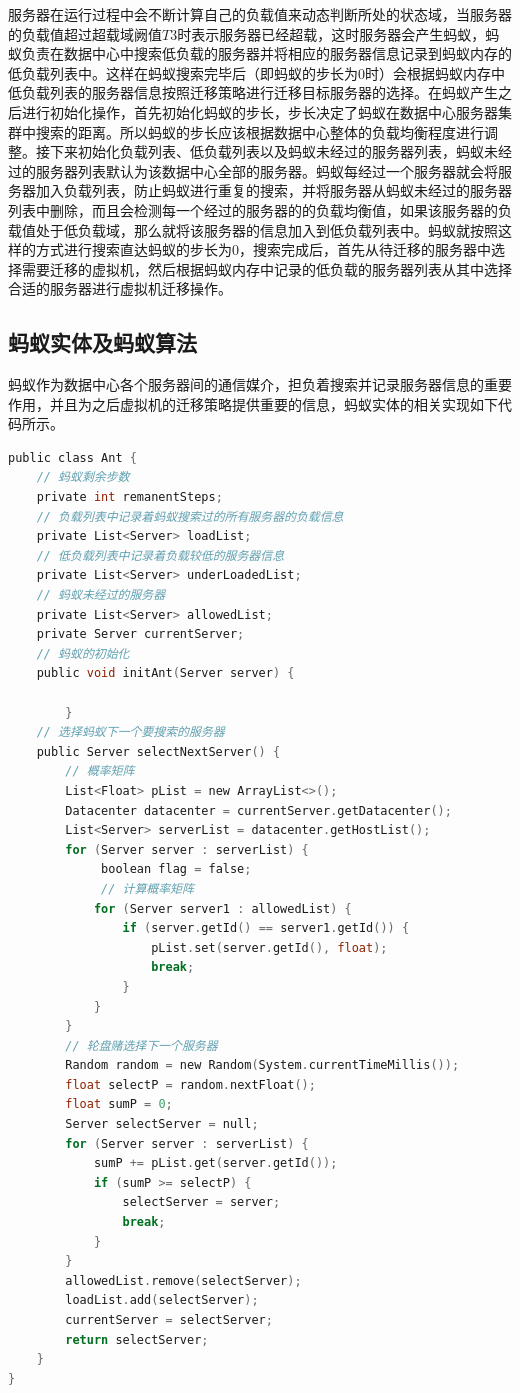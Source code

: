 服务器在运行过程中会不断计算自己的负载值来动态判断所处的状态域，当服务器的负载值超过超载域阙值$ T3 $时表示服务器已经超载，这时服务器会产生蚂蚁，蚂蚁负责在数据中心中搜索低负载的服务器并将相应的服务器信息记录到蚂蚁内存的低负载列表中。这样在蚂蚁搜索完毕后（即蚂蚁的步长为0时）会根据蚂蚁内存中低负载列表的服务器信息按照迁移策略进行迁移目标服务器的选择。在蚂蚁产生之后进行初始化操作，首先初始化蚂蚁的步长，步长决定了蚂蚁在数据中心服务器集群中搜索的距离。所以蚂蚁的步长应该根据数据中心整体的负载均衡程度进行调整。接下来初始化负载列表、低负载列表以及蚂蚁未经过的服务器列表，蚂蚁未经过的服务器列表默认为该数据中心全部的服务器。蚂蚁每经过一个服务器就会将服务器加入负载列表，防止蚂蚁进行重复的搜索，并将服务器从蚂蚁未经过的服务器列表中删除，而且会检测每一个经过的服务器的的负载均衡值，如果该服务器的负载值处于低负载域，那么就将该服务器的信息加入到低负载列表中。蚂蚁就按照这样的方式进行搜索直达蚂蚁的步长为0，搜索完成后，首先从待迁移的服务器中选择需要迁移的虚拟机，然后根据蚂蚁内存中记录的低负载的服务器列表从其中选择合适的服务器进行虚拟机迁移操作。

\subsection{蚂蚁实体及蚂蚁算法}
蚂蚁作为数据中心各个服务器间的通信媒介，担负着搜索并记录服务器信息的重要作用，并且为之后虚拟机的迁移策略提供重要的信息，蚂蚁实体的相关实现如下代码所示。

\begin{lstlisting}[language=C,caption={蚂蚁实体},label=Code:java]
public class Ant {
    // 蚂蚁剩余步数
    private int remanentSteps;
    // 负载列表中记录着蚂蚁搜索过的所有服务器的负载信息
    private List<Server> loadList;
    // 低负载列表中记录着负载较低的服务器信息
    private List<Server> underLoadedList;
    // 蚂蚁未经过的服务器
    private List<Server> allowedList;
    private Server currentServer;
    // 蚂蚁的初始化
    public void initAnt(Server server) {
            
        }
    // 选择蚂蚁下一个要搜索的服务器
    public Server selectNextServer() {
        // 概率矩阵
        List<Float> pList = new ArrayList<>();
        Datacenter datacenter = currentServer.getDatacenter();
        List<Server> serverList = datacenter.getHostList();
        for (Server server : serverList) {
             boolean flag = false;
             // 计算概率矩阵
            for (Server server1 : allowedList) {
                if (server.getId() == server1.getId()) {
                    pList.set(server.getId(), float);
                    break;
                }
            }
        }
        // 轮盘赌选择下一个服务器
        Random random = new Random(System.currentTimeMillis());
        float selectP = random.nextFloat();
        float sumP = 0;
        Server selectServer = null;
        for (Server server : serverList) {
            sumP += pList.get(server.getId());
            if (sumP >= selectP) {
                selectServer = server;
                break;
            }
        }
        allowedList.remove(selectServer);
        loadList.add(selectServer);
        currentServer = selectServer;
        return selectServer;
    }
}
\end{lstlisting}

